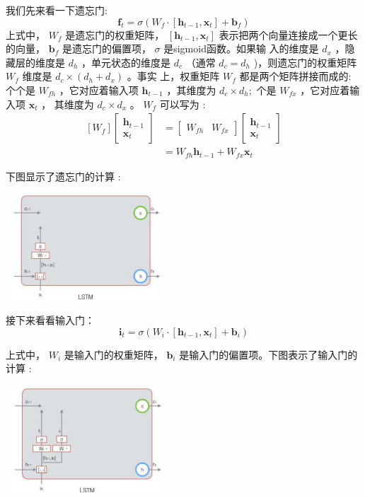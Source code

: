 \documentclass[10.5pt,compsoc]{CjC}
\theoremstyle{mystyle}
\begin{document}
我们先来看一下遗忘门:
$$
\mathbf{f}_{t}=\sigma\left(W_{f} \cdot\left[\mathbf{h}_{t-1}, \mathbf{x}_{t}\right]+\mathbf{b}_{f}\right)
$$
上式中， $W_{f}$ 是遗忘门的权重矩阵， $\left[\mathbf{h}_{t-1}, \mathbf{x}_{t}\right]$ 表示把两个向量连接成一个更长的向量， $\mathbf{b}_{f}$ 是遗忘门的偏置项， $\sigma$ 是sigmoid函数。如果输 入的维度是 $d_{x}$ ，隐藏层的维度是 $d_{h}$ ，单元状态的维度是 $d_{c}$ （通常 $d_{c}=d_{h}$ )，则遗忘门的权重矩阵 $W_{f}$ 维度是 $d_{c} \times\left(d_{h}+d_{x}\right)$ 。事实 上，权重矩阵 $W_{f}$ 都是两个矩阵拼接而成的: 个个是 $W_{f h}$ ，它对应着输入项 $\mathbf{h}_{t-1}$ ，其维度为 $d_{c} \times d_{h} ;$ 个是 $W_{f x}$ ，它对应着输入项 $\mathbf{x}_{t}$ ， 其维度为 $d_{c} \times d_{x}$ 。 $W_{f}$ 可以写为 :
$$
\begin{aligned}
{\left[W_{f}\right]\left[\begin{array}{c}
\mathbf{h}_{t-1} \\
\mathbf{x}_{t}
\end{array}\right] } &=\left[\begin{array}{ll}
W_{f h} & W_{f x}
\end{array}\right]\left[\begin{array}{c}
\mathbf{h}_{t-1} \\
\mathbf{x}_{t}
\end{array}\right] \\
&=W_{f h} \mathbf{h}_{t-1}+W_{f x} \mathbf{x}_{t}
\end{aligned}
$$

下图显示了遗忘门的计算 :

\includegraphics[width=6cm, height=4cm]{images/2022_05_03_e4231fc9c1842f38b0acg-03(1)}

接下来看看输入门：
$$
\mathbf{i}_{t}=\sigma\left(W_{i} \cdot\left[\mathbf{h}_{t-1}, \mathbf{x}_{t}\right]+\mathbf{b}_{i}\right)
$$

上式中， $W_{i}$ 是输入门的权重矩阵， $\mathbf{b}_{i}$ 是输入门的偏置项。下图表示了输入门的计算 :

\includegraphics[width=6cm, height=4cm]{images/2022_05_03_e4231fc9c1842f38b0acg-04}
\end{document}
